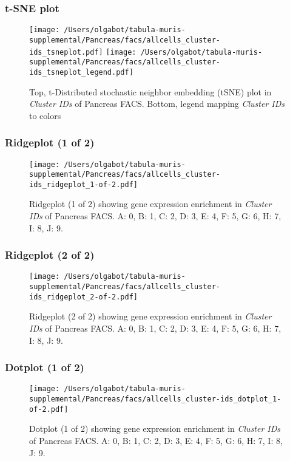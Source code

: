 \clearpage
\subsubsection{t-SNE plot}
\begin{figure}[h]
\centering
\texttt{[image: /Users/olgabot/tabula-muris-supplemental/Pancreas/facs/allcells\_cluster-ids\_tsneplot.pdf]}
\texttt{[image: /Users/olgabot/tabula-muris-supplemental/Pancreas/facs/allcells\_cluster-ids\_tsneplot\_legend.pdf]}
\caption{Top, t-Distributed stochastic neighbor embedding (tSNE) plot  in \emph{Cluster IDs} of Pancreas FACS. Bottom, legend mapping \emph{Cluster IDs} to colors}
\end{figure}


\clearpage

\subsubsection{Ridgeplot (1 of 2)}
\begin{figure}[h]
\centering
\texttt{[image: /Users/olgabot/tabula-muris-supplemental/Pancreas/facs/allcells\_cluster-ids\_ridgeplot\_1-of-2.pdf]}

\caption{ Ridgeplot (1 of 2)  showing gene expression enrichment in \emph{Cluster IDs} of Pancreas FACS. A: 0, B: 1, C: 2, D: 3, E: 4, F: 5, G: 6, H: 7, I: 8, J: 9.}
\end{figure}


\clearpage

\subsubsection{Ridgeplot (2 of 2)}
\begin{figure}[h]
\centering
\texttt{[image: /Users/olgabot/tabula-muris-supplemental/Pancreas/facs/allcells\_cluster-ids\_ridgeplot\_2-of-2.pdf]}

\caption{ Ridgeplot (2 of 2)  showing gene expression enrichment in \emph{Cluster IDs} of Pancreas FACS. A: 0, B: 1, C: 2, D: 3, E: 4, F: 5, G: 6, H: 7, I: 8, J: 9.}
\end{figure}


\clearpage

\subsubsection{Dotplot (1 of 2)}
\begin{figure}[h]
\centering
\texttt{[image: /Users/olgabot/tabula-muris-supplemental/Pancreas/facs/allcells\_cluster-ids\_dotplot\_1-of-2.pdf]}

\caption{ Dotplot (1 of 2)  showing gene expression enrichment in \emph{Cluster IDs} of Pancreas FACS. A: 0, B: 1, C: 2, D: 3, E: 4, F: 5, G: 6, H: 7, I: 8, J: 9.}
\end{figure}



